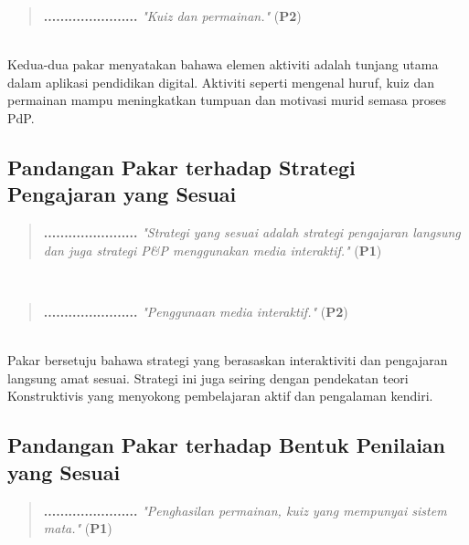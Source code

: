 {{\begin{quote}
\begin{center}
\textbf{.......................} \textit{"Kuiz dan permainan."} (\textbf{P2})
\end{center}
\end{quote}\\

Kedua-dua pakar menyatakan bahawa elemen aktiviti adalah tunjang utama dalam aplikasi pendidikan digital. Aktiviti seperti mengenal huruf, kuiz dan permainan mampu meningkatkan tumpuan dan motivasi murid semasa proses PdP.

\subsection{Pandangan Pakar terhadap Strategi Pengajaran yang Sesuai}


\begin{quote}
\begin{center}
\textbf{.......................} \textit{"Strategi yang sesuai adalah strategi pengajaran langsung dan juga strategi P\&P menggunakan media interaktif."} (\textbf{P1})
\end{center}
\end{quote}\\

\begin{quote}
\begin{center}
\textbf{.......................} \textit{"Penggunaan media interaktif."} (\textbf{P2})
\end{center}
\end{quote}\\

Pakar bersetuju bahawa strategi yang berasaskan interaktiviti dan pengajaran langsung amat sesuai. Strategi ini juga seiring dengan pendekatan teori Konstruktivis yang menyokong pembelajaran aktif dan pengalaman kendiri.

\subsection{Pandangan Pakar terhadap Bentuk Penilaian yang Sesuai}


\begin{quote}
\begin{center}
\textbf{.......................} \textit{"Penghasilan permainan, kuiz yang mempunyai sistem mata."} (\textbf{P1})
\end{center}
\end{quote}\\

}}
